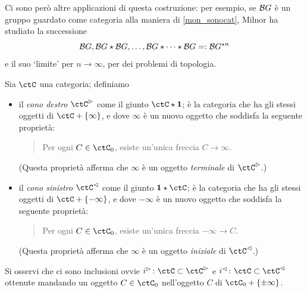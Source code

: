Ci sono però altre applicazioni di questa costruzione: per esempio, se \(\mathcal{B} G\) è un gruppo guardato come categoria alla maniera di \ref{mon_sonocat}, Milnor \cite{milnor1,milnor2} ha studiato la successione \[\mathcal{B} G, \mathcal{B} G\star\mathcal{B} G, \dots, \mathcal{B} G \star\dots\star \mathcal{B} G =:\mathcal{B} G^{\star n}\] e il suo `limite' per \(n\to\infty\), per dei problemi di topologia.
\begin{definition}\label{def_cono_su_C}
 Sia \(\ctC\) una categoria; definiamo
 \begin{itemize}
  \item il \emph{cono destro} \(\ctC^\rhd\) come il giunto \(\ctC\star \ctTerm\); è la categoria che ha gli stessi oggetti di \(\ctC + \{\infty\}\), e dove \(\infty\) è un nuovo oggetto che soddisfa la seguente proprietà:
        \begin{quote}
         Per ogni \(C\in\ctC_0\), esiste un'unica freccia \(C\to\infty\).
        \end{quote}
        (Questa proprietà afferma che \(\infty\) è un oggetto \emph{terminale} di \(\ctC^\rhd\).)
  \item il \emph{cono sinistro} \(\ctC^\lhd\) come il giunto \(\ctTerm\star \ctC\); è la categoria che ha gli stessi oggetti di \(\ctC + \{-\infty\}\), e dove \(-\infty\) è un nuovo oggetto che soddisfa la seguente proprietà:
        \begin{quote}
         Per ogni \(C\in\ctC_0\), esiste un'unica freccia \(-\infty \to C\).
        \end{quote}
        (Questa proprietà afferma che \(\infty\) è un oggetto \emph{iniziale} di \(\ctC^\lhd\).)
 \end{itemize}
 Si osservi che ci sono inclusioni ovvie \(i^\rhd \colon \ctC \subset \ctC^\rhd\) e \(i^\lhd \colon \ctC \subset \ctC^\lhd\) ottenute mandando un oggetto \(C \in\ctC_0\) nell'oggetto \(C\) di \(\ctC_0 + \{\pm\infty\}\).
\end{definition}
